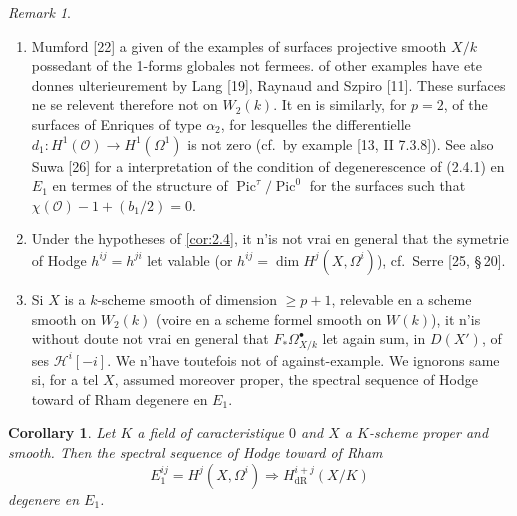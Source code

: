 \documentclass[12pt,a4paper]{article}
\theoremstyle{plain}
\newtheorem{corollary}[theorem]{Corollary}
\theoremstyle{definition}
\theoremstyle{remark}
\newtheorem{remark}[theorem]{Remark}
\DeclareMathOperator{\Pic}{Pic}
\newcommand{\cO}{\mathcal{O}}
\newcommand{\dR}{\text{dR}}
\begin{document}
\begin{remark}\label{rem:2.6}
\begin{enumerate}[label=(\roman*)]
\item Mumford [22] a given of the examples of surfaces projective smooth $X/k$ possedant of the 1-forms globales not fermees. of other examples have ete donnes ulterieurement by Lang [19], Raynaud and Szpiro [11]. These surfaces ne se relevent therefore not on $W_2(k)$. It en is similarly, for $p = 2$, of the surfaces of Enriques of type $\alpha_2$, for lesquelles the differentielle $d_1: H^1(\cO) \to H^1(\Omega^1)$ is not zero (cf.~by example [13, II 7.3.8]). See also Suwa [26] for a interpretation of the condition of degenerescence of (2.4.1) en $E_1$ en termes of the structure of $\Pic^\tau/\Pic^0$ for the surfaces such that $\chi(\cO) - 1 + (b_1/2) = 0$.

\item Under the hypotheses of \ref{cor:2.4}, it n'is not vrai en general that the symetrie of Hodge $h^{ij} = h^{ji}$ let valable (or $h^{ij} = \dim H^j(X, \Omega^i)$), cf.~Serre [25, \S\,20].

\item Si $X$ is a $k$-scheme smooth of dimension $\ge p+1$, relevable en a scheme smooth on $W_2(k)$ (voire en a scheme formel smooth on $W(k)$), it n'is without doute not vrai en general that $F_* \Omega^{\bullet}_{X/k}$ let again sum, in $D(X')$, of ses $\mathscr{H}^i[-i]$. We n'have toutefois not of against-example. We ignorons same si, for a tel $X$, assumed moreover proper, the spectral sequence of Hodge toward of Rham degenere en $E_1$.
\end{enumerate}
\end{remark}

\begin{corollary}\label{cor:2.7}
Let $K$ a field of caracteristique $0$ and $X$ a $K$-scheme proper and smooth. Then the spectral sequence of Hodge toward of Rham
\begin{equation}\label{eq:2.7.1}
E_1^{ij} = H^j(X, \Omega^i) \Rightarrow H^{i+j}_{\dR}(X/K)
\end{equation}
degenere en $E_1$.
\end{corollary}
\end{document}
